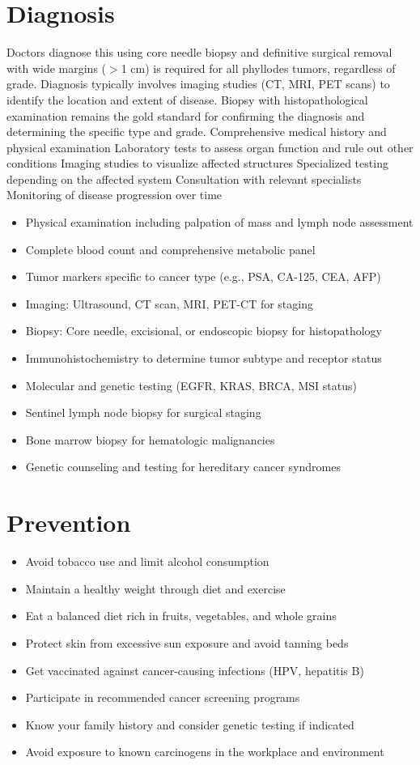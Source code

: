 \section{Diagnosis}
Doctors diagnose this using core needle biopsy and definitive surgical removal with wide margins ($>$1 cm) is required for all phyllodes tumors, regardless of grade. Diagnosis typically involves imaging studies (CT, MRI, PET scans) to identify the location and extent of disease. Biopsy with histopathological examination remains the gold standard for confirming the diagnosis and determining the specific type and grade. Comprehensive medical history and physical examination Laboratory tests to assess organ function and rule out other conditions Imaging studies to visualize affected structures Specialized testing depending on the affected system Consultation with relevant specialists Monitoring of disease progression over time

\begin{itemize}[noitemsep]
  \item Physical examination including palpation of mass and lymph node assessment
  \item Complete blood count and comprehensive metabolic panel
  \item Tumor markers specific to cancer type (e.g., PSA, CA-125, CEA, AFP)
  \item Imaging: Ultrasound, CT scan, MRI, PET-CT for staging
  \item Biopsy: Core needle, excisional, or endoscopic biopsy for histopathology
  \item Immunohistochemistry to determine tumor subtype and receptor status
  \item Molecular and genetic testing (EGFR, KRAS, BRCA, MSI status)
  \item Sentinel lymph node biopsy for surgical staging
  \item Bone marrow biopsy for hematologic malignancies
  \item Genetic counseling and testing for hereditary cancer syndromes
\end{itemize}
\section{Prevention}
\begin{itemize}[noitemsep]
  \item Avoid tobacco use and limit alcohol consumption
  \item Maintain a healthy weight through diet and exercise
  \item Eat a balanced diet rich in fruits, vegetables, and whole grains
  \item Protect skin from excessive sun exposure and avoid tanning beds
  \item Get vaccinated against cancer-causing infections (HPV, hepatitis B)
  \item Participate in recommended cancer screening programs
  \item Know your family history and consider genetic testing if indicated
  \item Avoid exposure to known carcinogens in the workplace and environment
\end{itemize}
